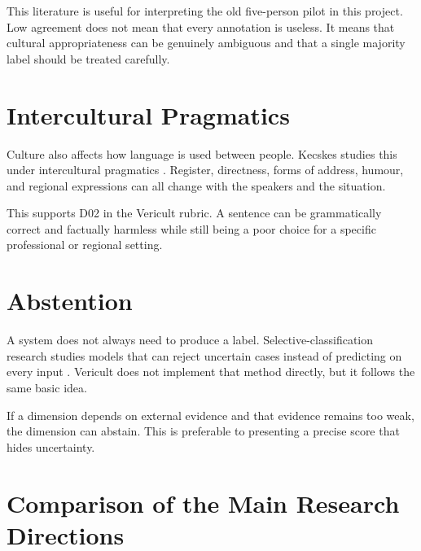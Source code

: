 This literature is useful for interpreting the old five-person pilot in this project. Low agreement does not mean that every annotation is useless. It means that cultural appropriateness can be genuinely ambiguous and that a single majority label should be treated carefully.

\section{Intercultural Pragmatics}

Culture also affects how language is used between people. Kecskes studies this under intercultural pragmatics \parencite{kecskes2014intercultural}. Register, directness, forms of address, humour, and regional expressions can all change with the speakers and the situation.

This supports D02 in the Vericult rubric. A sentence can be grammatically correct and factually harmless while still being a poor choice for a specific professional or regional setting.

\section{Abstention}

A system does not always need to produce a label. Selective-classification research studies models that can reject uncertain cases instead of predicting on every input \parencite{geifman2017selective}. Vericult does not implement that method directly, but it follows the same basic idea.

If a dimension depends on external evidence and that evidence remains too weak, the dimension can abstain. This is preferable to presenting a precise score that hides uncertainty.

\section{Comparison of the Main Research Directions}


